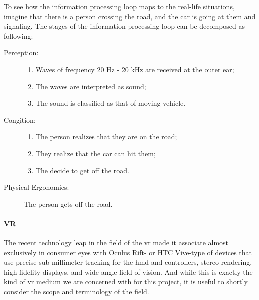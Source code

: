 To see how the information processing loop maps to the real-life situations, imagine that there is a person crossing the road, and the car is going at them and signaling. The stages of the information processing loop can be decomposed as following:
\begin{description}
	\item[Perception:] \hfill
		
		\begin{enumerate}
			\item Waves of frequency 20 Hz - 20 kHz are received at the outer ear;
			\item The waves are interpreted as sound;
			\item The sound is classified as that of moving vehicle.
		\end{enumerate}
	\item[Congition:] \hfill
		
		\begin{enumerate}
			\item The person realizes that they are on the road;
			\item They realize that the car can hit them;
			\item The decide to get off the road.
		\end{enumerate}
	\item[Physical Ergonomics:] \hfill
			
			The person gets off the road.
		
\end{description}

\paragraph{VR}
The recent technology leap in the field of the \gls{vr} made it associate almost exclusively in consumer eyes with Oculus Rift- or HTC Vive-type of devices that use precise sub-millimeter tracking for the \gls{hmd} and controllers, stereo rendering, high fidelity displays, and wide-angle field of vision. And while this is exactly the kind of \gls{vr} medium we are concerned with for this project, it is useful to shortly consider the scope and terminology of the field.

